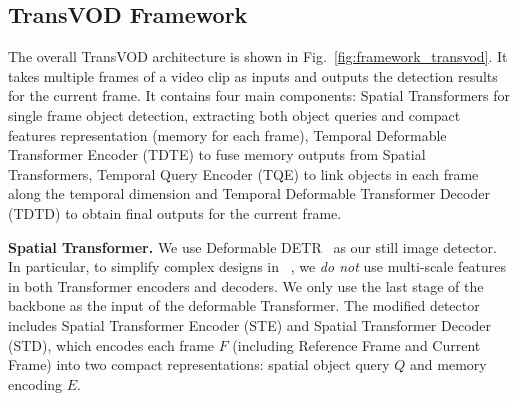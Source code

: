 \documentclass[10pt,journal,compsoc]{IEEEtran}
\begin{document}
\subsection{TransVOD Framework} 
\label{sec:TransVOD}
The overall TransVOD architecture is shown in Fig.~\ref{fig:framework_transvod}. It takes multiple frames of a video clip as inputs and outputs the detection results for the current frame. It contains four main components: Spatial Transformers for single frame object detection, extracting both object queries and compact features representation (memory for each frame), Temporal Deformable Transformer Encoder (TDTE) to fuse memory outputs from Spatial Transformers, Temporal Query Encoder (TQE) to link objects in each frame along the temporal dimension and Temporal Deformable Transformer Decoder (TDTD) to obtain final outputs for the current frame.

\vspace{-4mm}
\noindent
\textbf{Spatial Transformer.} We use Deformable DETR~\cite{zhu2020deformable} as our still image detector. In particular, to simplify complex designs in ~\cite{zhu2020deformable}, we \emph{do not} use multi-scale features in both Transformer encoders and decoders. We only use the last stage of the backbone as the input of the deformable Transformer. The modified detector includes Spatial Transformer Encoder (STE) and Spatial Transformer Decoder (STD), which encodes each frame $F$ (including Reference Frame and Current Frame) into two compact representations: spatial object query $Q$ and memory encoding $E$.
\end{document}
